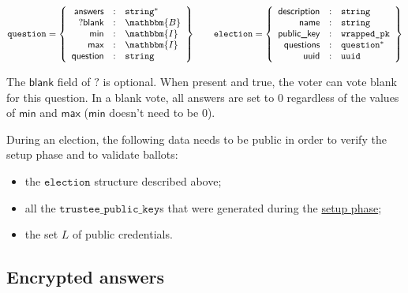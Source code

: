 \documentclass[a4paper]{article}
\newcommand{\I}{\mathbbm{I}}
\newcommand{\B}{\mathbbm{B}}
\newcommand{\jstring}{\texttt{string}}
\newcommand{\tpk}{\texttt{trustee\_public\_key}}
\newcommand{\election}{\texttt{election}}
\begin{document}
\newcommand{\blank}{\textsf{blank}}
\newcommand{\minlabel}{\textsf{min}}
\newcommand{\maxlabel}{\textsf{max}}
\newcommand{\answers}{\textsf{answers}}

\begin{gather*}
  \question=\left\{
    \begin{array}{rcl}
      \answers&:&\jstring^\ast\\
      ?\blank&:&\B\\
      \minlabel&:&\I\\
      \maxlabel&:&\I\\
      \textsf{question}&:&\jstring
    \end{array}
  \right\}
  \qquad
  \election=\left\{
    \begin{array}{rcl}
      \textsf{description}&:&\jstring\\
      \textsf{name}&:&\jstring\\
      \textsf{public\_key}&:&\texttt{wrapped\_pk}\\
      \textsf{questions}&:&\texttt{question}^\ast\\
      \textsf{uuid}&:&\texttt{uuid}
    \end{array}
  \right\}
\end{gather*}

The $\blank$ field of $\question$ is optional. When present and true,
the voter can vote blank for this question. In a blank vote, all
answers are set to $0$ regardless of the values of $\minlabel$ and
$\maxlabel$ ($\minlabel$ doesn't need to be $0$).

\newcommand{\answer}{\texttt{answer}}
\newcommand{\signature}{\texttt{signature}}
\newcommand{\iproofs}{\textsf{individual\_proofs}}
\newcommand{\oproof}{\textsf{overall\_proof}}
\newcommand{\bproof}{\textsf{blank\_proof}}
\newcommand{\choices}{\textsf{choices}}
\newcommand{\iprove}{\textsf{iprove}}

During an election, the following data needs to be public in order to
verify the setup phase and to validate ballots:
\begin{itemize}
\item the $\election$ structure described above;
\item all the $\tpk$s that were generated during the
  \hyperref[election-setup]{setup phase};
\item the set $L$ of public credentials.
\end{itemize}

\subsection{Encrypted answers}
\label{answers}
\end{document}
